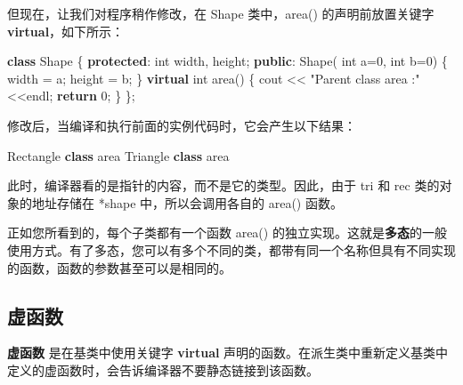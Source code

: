 \documentclass[
]{article}
\newenvironment{Shaded}{}{}
\newcommand{\ControlFlowTok}[1]{\textcolor[rgb]{0.00,0.44,0.13}{\textbf{#1}}}
\newcommand{\DataTypeTok}[1]{\textcolor[rgb]{0.56,0.13,0.00}{#1}}
\newcommand{\DecValTok}[1]{\textcolor[rgb]{0.25,0.63,0.44}{#1}}
\newcommand{\KeywordTok}[1]{\textcolor[rgb]{0.00,0.44,0.13}{\textbf{#1}}}
\newcommand{\NormalTok}[1]{#1}
\newcommand{\OperatorTok}[1]{\textcolor[rgb]{0.40,0.40,0.40}{#1}}
\newcommand{\StringTok}[1]{\textcolor[rgb]{0.25,0.44,0.63}{#1}}
\begin{document}
但现在，让我们对程序稍作修改，在 Shape 类中，area() 的声明前放置关键字
\textbf{virtual}，如下所示：

\begin{Shaded}
\begin{Highlighting}[]
\KeywordTok{class}\NormalTok{ Shape }\OperatorTok{\{}
   \KeywordTok{protected}\OperatorTok{:}
      \DataTypeTok{int}\NormalTok{ width}\OperatorTok{,}\NormalTok{ height}\OperatorTok{;}
   \KeywordTok{public}\OperatorTok{:}
\NormalTok{      Shape}\OperatorTok{(} \DataTypeTok{int}\NormalTok{ a}\OperatorTok{=}\DecValTok{0}\OperatorTok{,} \DataTypeTok{int}\NormalTok{ b}\OperatorTok{=}\DecValTok{0}\OperatorTok{)}
      \OperatorTok{\{}
\NormalTok{         width }\OperatorTok{=}\NormalTok{ a}\OperatorTok{;}
\NormalTok{         height }\OperatorTok{=}\NormalTok{ b}\OperatorTok{;}
      \OperatorTok{\}}
      \KeywordTok{virtual} \DataTypeTok{int}\NormalTok{ area}\OperatorTok{()}
      \OperatorTok{\{}
\NormalTok{         cout }\OperatorTok{\textless{}\textless{}} \StringTok{"Parent class area :"} \OperatorTok{\textless{}\textless{}}\NormalTok{endl}\OperatorTok{;}
         \ControlFlowTok{return} \DecValTok{0}\OperatorTok{;}
      \OperatorTok{\}}
\OperatorTok{\};}
\end{Highlighting}
\end{Shaded}

修改后，当编译和执行前面的实例代码时，它会产生以下结果：

\begin{Shaded}
\begin{Highlighting}[]
\NormalTok{Rectangle }\KeywordTok{class}\NormalTok{ area}
\NormalTok{Triangle }\KeywordTok{class}\NormalTok{ area}
\end{Highlighting}
\end{Shaded}

此时，编译器看的是指针的内容，而不是它的类型。因此，由于 tri 和 rec
类的对象的地址存储在 *shape 中，所以会调用各自的 area() 函数。

正如您所看到的，每个子类都有一个函数 area()
的独立实现。这就是\textbf{多态}的一般使用方式。有了多态，您可以有多个不同的类，都带有同一个名称但具有不同实现的函数，函数的参数甚至可以是相同的。

\hypertarget{ux865aux51fdux6570}{%
\subsection{虚函数}\label{ux865aux51fdux6570}}

\textbf{虚函数} 是在基类中使用关键字 \textbf{virtual}
声明的函数。在派生类中重新定义基类中定义的虚函数时，会告诉编译器不要静态链接到该函数。
\end{document}
